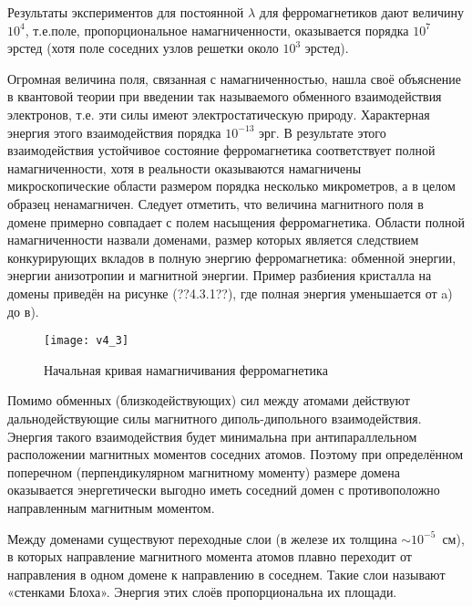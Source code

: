 Результаты экспериментов для постоянной $\lambda$ для ферромагнетиков дают величину $10^4$, т.е.поле, пропорциональное намагниченности, оказывается порядка $10^7$ эрстед (хотя поле соседних узлов решетки около $10^3$  эрстед).

Огромная величина поля, связанная с намагниченностью, нашла своё объяснение в квантовой теории при введении так называемого обменного взаимодействия электронов, т.е. эти силы имеют электростатическую природу. Характерная энергия этого взаимодействия порядка $10^{-13}$ эрг. В результате этого взаимодействия устойчивое состояние ферромагнетика соответствует полной намагниченности, хотя в реальности   оказываются намагничены микроскопические области размером порядка несколько микрометров, а в целом образец ненамагничен. Следует  отметить, что величина магнитного поля в домене примерно совпадает с полем насыщения ферромагнетика. Области полной намагниченности назвали доменами, размер которых является следствием конкурирующих вкладов в полную энергию ферромагнетика: обменной энергии, энергии анизотропии и магнитной энергии. Пример разбиения кристалла на домены приведён на рисунке (??4.3.1??), где полная энергия уменьшается от a) до в). 


\begin{wrapfigure}[]{r}{0.5\textwidth}
	\texttt{[image: v4\_3]}
	\caption{Начальная кривая намагничивания ферромагнетика}
\end{wrapfigure}

Помимо обменных (близкодействующих) сил между атомами действуют дальнодействующие силы магнитного диполь-дипольного взаимодействия. Энергия такого взаимодействия будет минимальна при антипараллельном расположении магнитных моментов соседних атомов. Поэтому при определённом поперечном (перпендикулярном магнитному моменту) размере домена оказывается энергетически выгодно иметь соседний домен с противоположно направленным магнитным моментом.

Между доменами существуют переходные слои (в железе их толщина $\sim 10^{-5}$~см), в которых направление магнитного момента атомов плавно переходит от направления в одном домене к направлению в соседнем. Такие слои называют «стенками Блоха». Энергия этих слоёв пропорциональна их площади.

